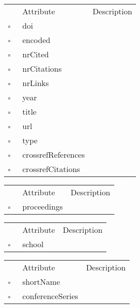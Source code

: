 \begin{table}
\caption{MissingWork  }

\begin{longtable}{llp{8cm}}
& Attribute & Description \\
$\square$\ & doi &  \\
$\square$\ & encoded &  \\
$\square$\ & nrCited &  \\
$\square$\ & nrCitations &  \\
$\square$\ & nrLinks &  \\
$\square$\ & year &  \\
$\square$\ & title &  \\
$\square$\ & url &  \\
$\square$\ & type &  \\
$\square$\ & crossrefReferences &  \\
$\square$\ & crossrefCitations &  \\
\end{longtable}
\label{attr:MissingWork}
\end{table}

\clearpage
\begin{table}
\caption{Paper  }

\begin{longtable}{llp{8cm}}
& Attribute & Description \\
$\square$\ & proceedings &  \\
\end{longtable}
\label{attr:Paper}
\end{table}

\begin{table}
\caption{PhDThesis  }

\begin{longtable}{llp{8cm}}
& Attribute & Description \\
$\square$\ & school &  \\
\end{longtable}
\label{attr:PhDThesis}
\end{table}

\begin{table}
\caption{Proceedings  }

\begin{longtable}{llp{8cm}}
& Attribute & Description \\
$\square$\ & shortName &  \\
$\square$\ & conferenceSeries &  \\
\end{longtable}
\label{attr:Proceedings}
\end{table}

